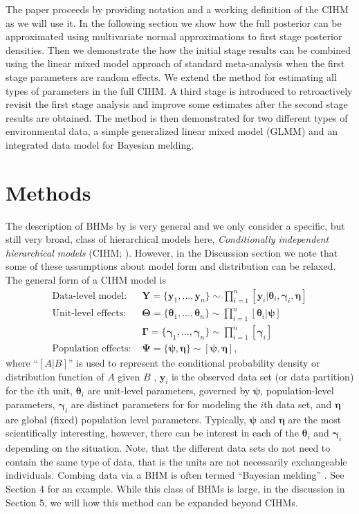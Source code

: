\documentclass[12pt]{article}
\newcommand{\by}{\mathbf{y}}
\newcommand{\bt}{\boldsymbol{\theta}}
\newcommand{\bn}{\boldsymbol{\eta}}
\newcommand{\bT}{\boldsymbol{\Theta}}
\newcommand{\bp}{\boldsymbol{\psi}}
\newcommand{\bP}{\boldsymbol{\Psi}}
\newcommand{\bg}{\boldsymbol{\gamma}}
\newcommand{\bG}{\boldsymbol{\Gamma}}
\newcommand{\bY}{\mathbf{Y}}
\begin{document}
The paper proceeds by providing notation and a working definition of the CIHM as we will use it. In the following section we show how the full posterior can be approximated using multivariate normal approximations to first stage posterior densities. Then we demonstrate the how the initial stage results can be combined using the linear mixed model approach of standard meta-analysis when the first stage parameters are random effects. We extend the method for estimating all types of parameters in the full CIHM. A third stage is introduced to retroactively revisit the first stage analysis and improve some estimates after the second stage results are obtained. The method is then demonstrated for two different types of environmental data, a simple generalized linear mixed model (GLMM) and an integrated data model for Bayesian melding. 


\section{Methods}

The description of BHMs by \cite{berliner1996hierarchical} is very general and we only consider a specific, but still very broad, class of hierarchical models here, {\it Conditionally independent hierarchical models} (CIHM; \citealt{kass1989approximate,gelfand2015hierarchical}). However, in the Discussion section we note that some of these assumptions about model form and distribution can be relaxed. The general form of a CIHM model is
\begin{equation}\label{eq:full.model}
\begin{aligned}
\text{Data-level model: } & \bY = \{\by_1,\dots,\by_n\} \sim \prod_{i=1}^n[\by_i|\bt_i, \bg_i, \bn] \\
\text{Unit-level effects: } & \bT = \{\bt_1,\dots,\bt_n\} \sim \prod_{i=1}^n[\bt_i|\bp]\\
 & \bG = \{\bg_1,\dots,\bg_n\} \sim \prod_{i=1}^n[\bg_i] \\
\text{Population effects: } & \bP = \{\bp,\bn\} \sim [\bp,\bn],
\end{aligned}
\end{equation}
where ``$[A|B]$'' is used to represent the conditional probability density or distribution function of $A$ given $B$ \citep{gelfand1990sampling}, $\by_i$ is the observed data set (or data partition) for the $i$th unit, $\bt_i$ are unit-level parameters, governed by $\bp$, population-level parameters, $\bg_i$ are distinct parameters for for modeling the $i$th data set, and $\bn$ are global (fixed) population level parameters. Typically, $\bp$ and $\bn$ are the most scientifically interesting, however, there can be interest in each of the $\bt_i$ and $\bg_i$ depending on the situation. Note, that the different data sets do not need to contain the same type of data, that is the units are not necessarily exchangeable individuals. Combing data via a BHM is often termed ``Bayesian melding''  \citep{goudie2019joining, liu2014bayesian}. See Section 4 for an example. While this class of BHMs is large, in the discussion in Section 5, we will how this method can be expanded beyond CIHMs.
\end{document}
